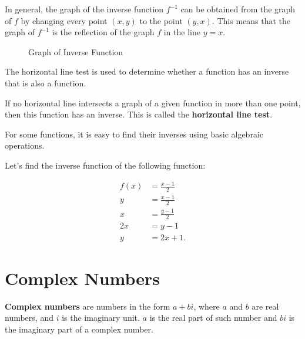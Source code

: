 In general, the graph of the inverse function $f^{-1}$ can be obtained from the
graph of $f$ by changing every point $(x,y)$ to the point $(y,x)$. This means
that the graph of $f^{-1}$ is the reflection of the graph $f$ in the line $y =
x$.

\begin{figure}[ht]
  \centering
  \caption{Graph of Inverse Function}
  \label{fig:graph_of_inverse_function}
\end{figure}

The horizontal line test is used to determine whether a function has an inverse
that is also a function.

\begin{definition}
  \label{def:horizontal_line_test}

  If no horizontal line intersects a graph of a given function in more than one
  point, then this function has an inverse. This is called the
  \textbf{horizontal line test}.
\end{definition}

For some functions, it is easy to find their inverses using basic algebraic
operations.

\begin{example}
  \label{exm:inverse_functions}

  Let's find the inverse function of the following function:

  \begin{align*}
    f(x) &= \frac{x - 1}{2} \\
    y &= \frac{x - 1}{2} \\
    x &= \frac{y - 1}{2} \\
    2x &= y - 1 \\
    y &= 2x + 1
  .\end{align*}
\end{example}



\section{Complex Numbers}
\label{sec:complex_numbers}

\begin{definition}
  \label{def:complex_numbers}

  \textbf{Complex numbers} are numbers in the form $a + bi$, where $a$ and $b$ 
  are real numbers, and $i$ is the imaginary unit. $a$ is the real part of such
  number and $bi$ is the imaginary part of a complex number.
\end{definition}

